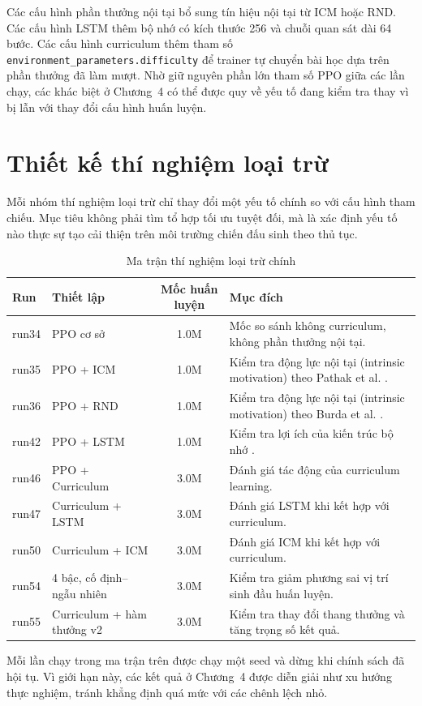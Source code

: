 Các cấu hình phần thưởng nội tại bổ sung tín hiệu nội tại từ ICM hoặc RND. Các cấu hình LSTM thêm bộ nhớ có kích thước 256 và chuỗi quan sát dài 64 bước. Các cấu hình curriculum thêm tham số \texttt{environment\_parameters.difficulty} để trainer tự chuyển bài học dựa trên phần thưởng đã làm mượt. Nhờ giữ nguyên phần lớn tham số PPO giữa các lần chạy, các khác biệt ở Chương~4 có thể được quy về yếu tố đang kiểm tra thay vì bị lẫn với thay đổi cấu hình huấn luyện.

\section{Thiết kế thí nghiệm loại trừ}

Mỗi nhóm thí nghiệm loại trừ chỉ thay đổi một yếu tố chính so với cấu hình tham chiếu. Mục tiêu không phải tìm tổ hợp tối ưu tuyệt đối, mà là xác định yếu tố nào thực sự tạo cải thiện trên môi trường chiến đấu sinh theo thủ tục.

\begin{table}[H]
    \centering
    \small
    \caption{Ma trận thí nghiệm loại trừ chính}
    \label{tab:ablation_matrix_design}
    \begin{tabular}{|p{2cm}|p{5.1cm}|c|p{5.2cm}|}
        \hline
        \textbf{Run} & \textbf{Thiết lập} & \textbf{Mốc huấn luyện} & \textbf{Mục đích} \\
        \hline
        run34 & PPO cơ sở & 1.0M & Mốc so sánh không curriculum, không phần thưởng nội tại. \\
        \hline
        run35 & PPO + ICM & 1.0M & Kiểm tra động lực nội tại (intrinsic motivation) theo Pathak et al. \cite{Pathak2017}. \\
        \hline
        run36 & PPO + RND & 1.0M & Kiểm tra động lực nội tại (intrinsic motivation) theo Burda et al. \cite{Burda2018}. \\
        \hline
        run42 & PPO + LSTM & 1.0M & Kiểm tra lợi ích của kiến trúc bộ nhớ \cite{Hochreiter1997}. \\
        \hline
        run46 & PPO + Curriculum & 3.0M & Đánh giá tác động của curriculum learning. \\
        \hline
        run47 & Curriculum + LSTM & 3.0M & Đánh giá LSTM khi kết hợp với curriculum. \\
        \hline
        run50 & Curriculum + ICM & 3.0M & Đánh giá ICM khi kết hợp với curriculum. \\
        \hline
        run54 & 4 bậc, cố định--ngẫu nhiên & 3.0M & Kiểm tra giảm phương sai vị trí sinh đầu huấn luyện. \\
        \hline
        run55 & Curriculum + hàm thưởng v2 & 3.0M & Kiểm tra thay đổi thang thưởng và tăng trọng số kết quả. \\
        \hline
    \end{tabular}
\end{table}
Mỗi lần chạy trong ma trận trên được chạy một seed và dừng khi chính sách đã hội tụ. Vì giới hạn này, các kết quả ở Chương~4 được diễn giải như xu hướng thực nghiệm, tránh khẳng định quá mức với các chênh lệch nhỏ.

